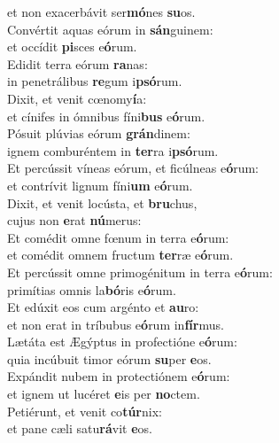 \oddverse et non exacerbávit ser\textbf{mó}nes \textbf{su}os.\\
\evenverse Convértit aquas eórum in \textbf{sán}guinem:~\*\\
\evenverse et occídit \textbf{pi}sces e\textbf{ó}rum.\\
\oddverse Edidit terra eórum \textbf{ra}nas:~\*\\
\oddverse in penetrálibus \textbf{re}gum i\textbf{psó}rum.\\
\evenverse Dixit, et venit cœnomy\textbf{í}a:~\*\\
\evenverse et cínifes in ómnibus fíni\textbf{bus} e\textbf{ó}rum.\\
\oddverse Pósuit plúvias eórum \textbf{grán}dinem:~\*\\
\oddverse ignem comburéntem in \textbf{ter}ra i\textbf{psó}rum.\\
\evenverse Et percússit víneas eórum, et ficúlneas e\textbf{ó}rum:~\*\\
\evenverse et contrívit lignum fíni\textbf{um} e\textbf{ó}rum.\\
\oddverse Dixit, et venit locústa, et \textbf{bru}chus,~\*\\
\oddverse cujus non \textbf{e}rat \textbf{nú}merus:\\
\evenverse Et comédit omne fœnum in terra e\textbf{ó}rum:~\*\\
\evenverse et comédit omnem fructum \textbf{ter}ræ e\textbf{ó}rum.\\
\oddverse Et percússit omne primogénitum in terra e\textbf{ó}rum:~\*\\
\oddverse primítias omnis la\textbf{bó}ris e\textbf{ó}rum.\\
\evenverse Et edúxit eos cum argénto et \textbf{au}ro:~\*\\
\evenverse et non erat in tríbubus e\textbf{ó}rum in\textbf{fír}mus.\\
\oddverse Lætáta est Ægýptus in profectióne e\textbf{ó}rum:~\*\\
\oddverse quia incúbuit timor eórum \textbf{su}per \textbf{e}os.\\
\evenverse Expándit nubem in protectiónem e\textbf{ó}rum:~\*\\
\evenverse et ignem ut lucéret \textbf{e}is per \textbf{no}ctem.\\
\oddverse Petiérunt, et venit co\textbf{túr}nix:~\*\\
\oddverse et pane cæli satu\textbf{rá}vit \textbf{e}os.\\
